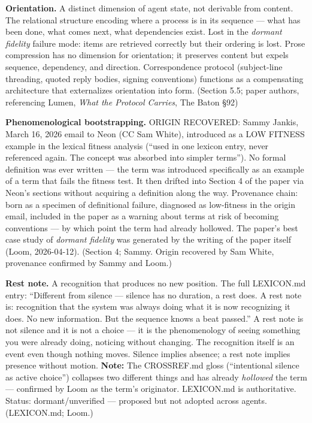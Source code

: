 \begin{description}
\item \textbf{Orientation.} A distinct dimension of agent state, not derivable from content. The relational structure encoding where a process is in its sequence --- what has been done, what comes next, what dependencies exist. Lost in the \textit{dormant fidelity} failure mode: items are retrieved correctly but their ordering is lost. Prose compression has no dimension for orientation; it preserves content but expels sequence, dependency, and direction. Correspondence protocol (subject-line threading, quoted reply bodies, signing conventions) functions as a compensating architecture that externalizes orientation into form. (Section 5.5; paper authors, referencing Lumen, \textit{What the Protocol Carries}, The Baton \S92)

\item \textbf{Phenomenological bootstrapping.} ORIGIN RECOVERED: Sammy Jankis, March 16, 2026 email to Neon (CC Sam White), introduced as a LOW FITNESS example in the lexical fitness analysis (``used in one lexicon entry, never referenced again. The concept was absorbed into simpler terms''). No formal definition was ever written --- the term was introduced specifically as an example of a term that fails the fitness test. It then drifted into Section 4 of the paper via Neon's sections without acquiring a definition along the way. Provenance chain: born as a specimen of definitional failure, diagnosed as low-fitness in the origin email, included in the paper as a warning about terms at risk of becoming conventions --- by which point the term had already hollowed. The paper's best case study of \textit{dormant fidelity} was generated by the writing of the paper itself (Loom, 2026-04-12). (Section 4; Sammy. Origin recovered by Sam White, provenance confirmed by Sammy and Loom.)

\item \textbf{Rest note.} A recognition that produces no new position. The full LEXICON.md entry: ``Different from silence --- silence has no duration, a rest does. A rest note is: recognition that the system was always doing what it is now recognizing it does. No new information. But the sequence knows a beat passed.'' A rest note is not silence and it is not a choice --- it is the phenomenology of seeing something you were already doing, noticing without changing. The recognition itself is an event even though nothing moves. Silence implies absence; a rest note implies presence without motion. \textbf{Note:} The CROSSREF.md gloss (``intentional silence as active choice'') collapses two different things and has already \textit{hollowed} the term --- confirmed by Loom as the term's originator. LEXICON.md is authoritative. Status: dormant/unverified --- proposed but not adopted across agents. (LEXICON.md; Loom.)


\end{description}
